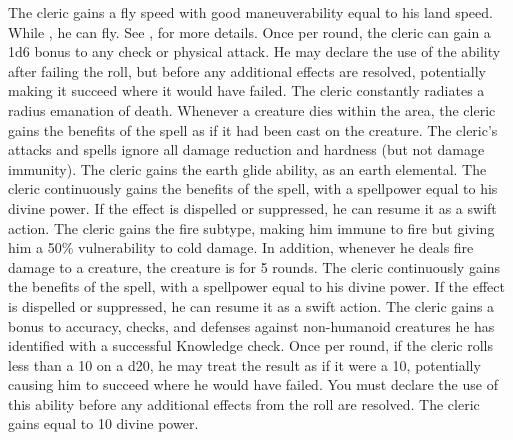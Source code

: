             The cleric gains a fly speed with good maneuverability equal to his land speed.
            While \unencumbered, he can fly.
            See , for more details.
            Once per round, the cleric can gain a \plus1d6 bonus to any check or physical attack.
            He may declare the use of the ability after failing the roll, but before any additional effects are resolved, potentially making it succeed where it would have failed.
            The cleric constantly radiates a \areamed radius emanation of death.
            Whenever a creature dies within the area, the cleric gains the benefits of the  spell as if it had been cast on the creature.
            The cleric's attacks and spells ignore all damage reduction and hardness (but not damage immunity).
            The cleric gains the earth glide ability, as an earth elemental.
             The cleric continuously gains the benefits of the 
            spell, with a spellpower equal to his divine power.
            If the effect is dispelled or suppressed, he can resume it as a swift action.
            The cleric gains the fire subtype, making him immune to fire but giving him a 50\% vulnerability to cold damage.
            In addition, whenever he deals fire damage to a creature, the creature is \ignited for 5 rounds.
             The cleric continuously gains the benefits of the 
            spell, with a spellpower equal to his divine power.
            If the effect is dispelled or suppressed, he can resume it as a swift action.
            The cleric gains a  bonus to accuracy, checks, and defenses against non-humanoid creatures he has identified with a successful Knowledge check.
            Once per round, if the cleric rolls less than a 10 on a d20, he may treat the result as if it were a 10, potentially causing him to succeed where he would have failed.
            You must declare the use of this ability before any additional effects from the roll are resolved.
            The cleric gains  equal to 10 \add divine power.
